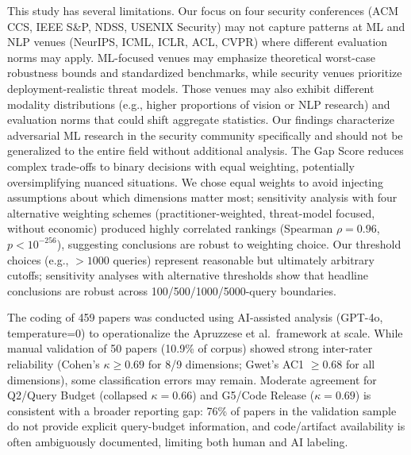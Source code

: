 \documentclass[runningheads]{llncs}
\begin{document}
This study has several limitations. Our focus on four security conferences (ACM CCS, IEEE S\&P, NDSS, USENIX Security) may not capture patterns at ML and NLP venues (NeurIPS, ICML, ICLR, ACL, CVPR) where different evaluation norms may apply. ML-focused venues may emphasize theoretical worst-case robustness bounds and standardized benchmarks, while security venues prioritize deployment-realistic threat models. Those venues may also exhibit different modality distributions (e.g., higher proportions of vision or NLP research) and evaluation norms that could shift aggregate statistics. Our findings characterize adversarial ML research in the security community specifically and should not be generalized to the entire field without additional analysis. The Gap Score reduces complex trade-offs to binary decisions with equal weighting, potentially oversimplifying nuanced situations. We chose equal weights to avoid injecting assumptions about which dimensions matter most; sensitivity analysis with four alternative weighting schemes (practitioner-weighted, threat-model focused, without economic) produced highly correlated rankings (Spearman $\rho = 0.96$, $p < 10^{-256}$), suggesting conclusions are robust to weighting choice. Our threshold choices (e.g., $> 1000$ queries) represent reasonable but ultimately arbitrary cutoffs; sensitivity analyses with alternative thresholds show that headline conclusions are robust across 100/500/1000/5000-query boundaries.

The coding of 459 papers was conducted using AI-assisted analysis (GPT-4o, temperature=0) to operationalize the Apruzzese et al.\ framework at scale. While manual validation of 50 papers (10.9\% of corpus) showed strong inter-rater reliability (Cohen's $\kappa \geq 0.69$ for 8/9 dimensions; Gwet's AC1 $\geq 0.68$ for all dimensions), some classification errors may remain. Moderate agreement for Q2/Query Budget (collapsed $\kappa = 0.66$) and G5/Code Release ($\kappa = 0.69$) is consistent with a broader reporting gap: 76\% of papers in the validation sample do not provide explicit query-budget information, and code/artifact availability is often ambiguously documented, limiting both human and AI labeling.
\end{document}
